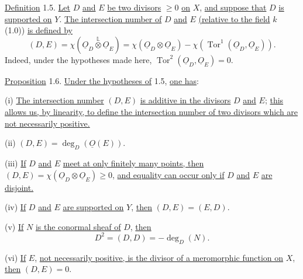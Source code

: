 \underline{Definition} 1.5. \underline{Let} $D$ \underline{and} $E$
\underline{be two divisors} $\geq0$ \underline{on} $X$, \underline{and suppose that}
$D$ \underline{is supported on} $Y$. \underline{The intersection number of} $D$
\underline{and} $E$ \underline{(relative to the field} $k$ (1.0)) \underline{is
defined by}
\begin{equation*}
(D,E)=\chi(\underline{O}_D\overset{\mathbb L}{\otimes}\underline{O}_E)
=\chi(\underline{O}_D\otimes\underline{O}_E)
-\chi(\operatorname{Tor}^1(\underline{O}_D,\underline{O}_E)).
\end{equation*}
Indeed, under the hypotheses made here,
$\operatorname{Tor}^2(\underline{O}_D,\underline{O}_E)=0$.

\underline{Proposition} 1.6. \underline{Under the hypotheses of} 1.5,
\underline{one has}:

(i) \quad \underline{The intersection number} $(D,E)$ \underline{is additive in the
divisors} $D$ \underline{and} $E$; \underline{this allows us, by linearity, to define
the intersection number of two divisors which are not necessarily positive.}


(ii) \quad $(D,E)=\deg_D(\underline O(E))$.

(iii) \quad \underline{If} $D$ \underline{and} $E$ \underline{meet at only finitely
many points, then} $(D,E)=\chi(\underline{O}_D\otimes\underline{O}_E)\geq0$,
\underline{and equality can occur only if} $D$ \underline{and} $E$
\underline{are disjoint.}

(iv) \quad \underline{If} $D$ \underline{and} $E$ \underline{are supported on} $Y$,
\underline{then} $(D,E)=(E,D)$.

(v) \quad \underline{If} $N$ \underline{is the conormal sheaf of} $D$,
\underline{then}
\begin{equation*}
D^2=(D,D)=-\deg_D(N).
\end{equation*}

(vi) \quad \underline{If} $E$, \underline{not necessarily positive, is the divisor
of a meromorphic function on} $X$, \underline{then} $(D,E)=0$.

